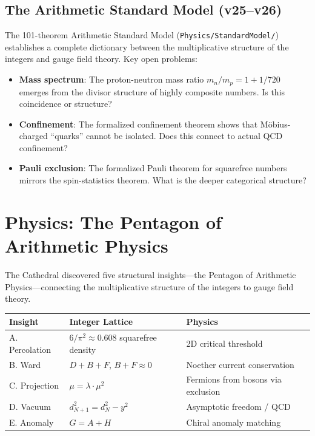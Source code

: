 \documentclass[11pt,a4paper]{article}
\begin{document}
\subsection{The Arithmetic Standard Model (v25--v26)}

The 101-theorem Arithmetic Standard Model
(\texttt{Physics/StandardModel/}) establishes a complete dictionary
between the multiplicative structure of the integers and gauge
field theory. Key open problems:
\begin{itemize}
  \item \textbf{Mass spectrum}: The proton-neutron mass ratio
    $m_n/m_p = 1 + 1/720$ emerges from the divisor structure of
    highly composite numbers. Is this coincidence or structure?
  \item \textbf{Confinement}: The formalized confinement theorem
    shows that M\"obius-charged ``quarks'' cannot be isolated.
    Does this connect to actual QCD confinement?
  \item \textbf{Pauli exclusion}: The formalized Pauli theorem
    for squarefree numbers mirrors the spin-statistics theorem.
    What is the deeper categorical structure?
\end{itemize}

\section{Physics: The Pentagon of Arithmetic Physics}

The Cathedral discovered five structural insights---the Pentagon
of Arithmetic Physics---connecting the multiplicative structure
of the integers to gauge field theory.

\begin{center}
\small
\begin{tabular}{@{}lll@{}}
\toprule
\textbf{Insight} & \textbf{Integer Lattice} & \textbf{Physics} \\
\midrule
A. Percolation & $6/\pi^2 \approx 0.608$ squarefree density & 2D critical threshold \\
B. Ward & $D + B + F$, $B + F \approx 0$ & Noether current conservation \\
C. Projection & $\mu = \lambda \cdot \mu^2$ & Fermions from bosons via exclusion \\
D. Vacuum & $d^2_{N+1} = d^2_N - y^2$ & Asymptotic freedom / QCD \\
E. Anomaly & $G = A + H$ & Chiral anomaly matching \\
\bottomrule
\end{tabular}
\end{center}
\end{document}

